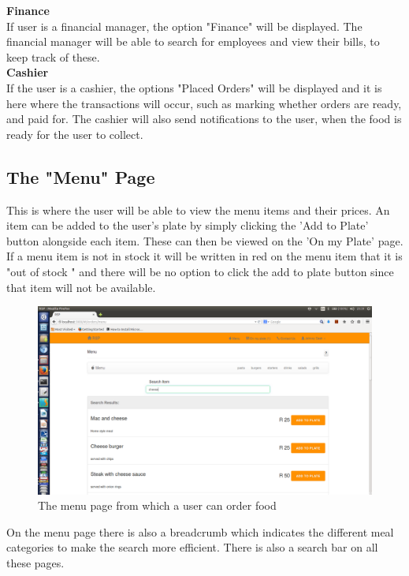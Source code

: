 \documentclass[a4paper,12pt]{article}
\begin{document}
\textbf{Finance}\\
If user is a financial manager, the option "Finance" will be displayed. The financial manager will be able to search for employees and view their bills, to keep track of these.\\

\textbf{Cashier}\\
If the user is a cashier, the options "Placed Orders" will be displayed and it is here where the transactions will occur, such as marking whether orders are ready, and paid for. The cashier will also send notifications to the user, when the food is ready for the user to collect. 

\subsection{The "Menu" Page} 
This is where the user will be able to view the menu items and their prices. An item can be added to the user's plate by simply clicking the 'Add to Plate' button alongside each item. These can then be viewed on the 'On my Plate' page.
If a menu item is not in stock it will be written in red on the menu item that it is "out of stock " and there will be no  option to click the add to plate button since that item will not be available. 
\\
\begin{figure}[H]
  \centering
    \includegraphics[width=1.0\textwidth]{screenshots/searchCheese.png}
    \caption{The menu page from which a user can order food} 
\end{figure}
On the menu page there is also a breadcrumb which indicates the different meal categories to make the search more efficient. There is also a search bar on all these pages. 
\end{document}
